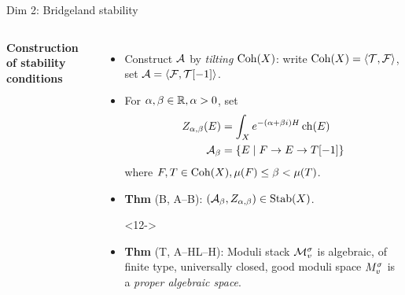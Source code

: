 \documentclass[8pt,handout]{beamer} %
\begin{document}
\begin{frame}{Dim 2: Bridgeland stability}
\begin{columns}[t]
        \textbf{Construction of stability conditions}
        \begin{itemize}
            \item<10-> Construct $\mathcal{A}$ by \textit{tilting} $\mathrm{Coh}(X)$: %
            write $\mathrm{Coh}(X) = \langle \mathcal{T}, \mathcal{F} \rangle$, set $\mathcal{A} = \langle \mathcal{F}, \mathcal{T}[-1] \rangle$.
            \item<11-> For $\alpha, \beta \in \mathbb{R}, \alpha > 0$, set
            \begin{align*}
                Z_{\alpha, \beta}(E) & = \int_X e^{-(\alpha + \beta i)H}\operatorname{\mathrm{ch}}(E) \\
                \mathcal{A}_\beta & = \{ E \;|\; F \to E \to T[-1] \}
            \end{align*}
            where $F, T \in \mathrm{Coh}(X), \mu(F) \le \beta < \mu(T)$. %
            \item<11-> \textbf{Thm} (B, A--B): $(\mathcal{A}_\beta, Z_{\alpha,\beta}) \in \operatorname{\mathrm{Stab}}(X)$.
            \item[]<12->
            \begin{center}
        \end{center}
            \item<13-> \textbf{Thm} (T, A--HL--H): Moduli stack $\mathcal{M}^\sigma_v$ is algebraic, of finite type, universally closed, good moduli space $M^\sigma_v$ is a \textit{proper algebraic space}.
        \end{itemize}
    \end{columns}
\end{frame}
\end{document}
